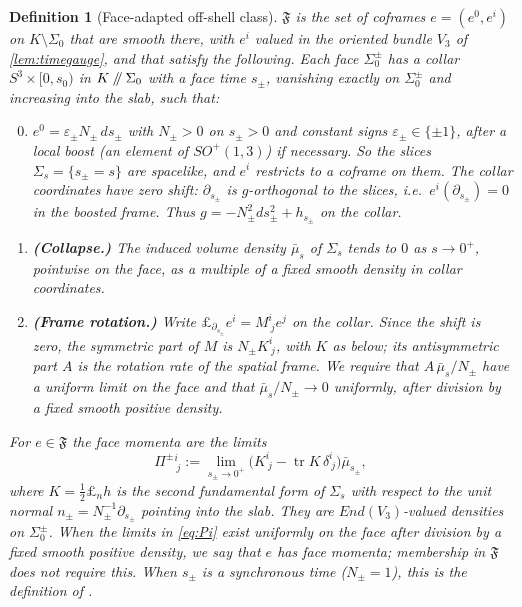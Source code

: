 \documentclass[11pt]{article}
\theoremstyle{canonmath}
\newtheorem{definition}[theorem]{Definition}
\theoremstyle{canonpostulate}
\theoremstyle{canonproposition}
\theoremstyle{canonmath}
\theoremstyle{canonproposition}
\providecommand{\cutK}{\Klein\mathbin{/\mkern-5mu/}\Sigma_0}
\providecommand{\Vb}{\mathcal{V}}
\providecommand{\Fcl}{\mathfrak{F}}
\providecommand{\Klein}{\mathcal{K}}
\def\mathrm#1{#1}%
\def\mathcal#1{#1}%
\begin{document}
\begin{definition}[Face-adapted off-shell class]\label{def:Fclass}
$\Fcl$ is the set of coframes $e = (e^0,e^i)$ on $\Klein\setminus\Sigma_0$ that are smooth there, with $e^i$ valued in the oriented bundle $\Vb_3$ of \cref{lem:timegauge}, and that satisfy the following. Each face $\Sigma_0^\pm$ has a collar $S^3\times[0,s_0)$ in $\cutK$ with a \emph{face time} $s_\pm$, vanishing exactly on $\Sigma_0^\pm$ and increasing into the slab, such that:
\begin{enumerate}[label=(F\arabic*)]
\setcounter{enumi}{-1}
\item $e^0 = \varepsilon_\pm N_\pm\,ds_\pm$ with $N_\pm>0$ on $s_\pm>0$ and constant signs $\varepsilon_\pm\in\{\pm1\}$, after a local boost (an element of $SO^+(1,3)$) if necessary. So the slices $\Sigma_s = \{s_\pm = s\}$ are spacelike, and $e^i$ restricts to a coframe on them. The collar coordinates have zero shift: $\partial_{s_\pm}$ is $g$-orthogonal to the slices, i.e.\ $e^i(\partial_{s_\pm}) = 0$ in the boosted frame. Thus $g = -N_\pm^2ds_\pm^2 + h_{s_\pm}$ on the collar.
\item \textbf{(Collapse.)} The induced volume density $\bar\mu_s$ of $\Sigma_s$ tends to $0$ as $s\to0^+$, pointwise on the face, as a multiple of a fixed smooth density in collar coordinates.
\item \textbf{(Frame rotation.)} Write $\pounds_{\partial_{s_\pm}}e^i = M^i_{\ j}e^j$ on the collar. Since the shift is zero, the symmetric part of $M$ is $N_\pm K^i_{\ j}$, with $K$ as below; its antisymmetric part $A$ is the rotation rate of the spatial frame. We require that $A\,\bar\mu_s/N_\pm$ have a uniform limit on the face and that $\bar\mu_s/N_\pm\to0$ uniformly, after division by a fixed smooth positive density.
\end{enumerate}
For $e\in\Fcl$ the \emph{face momenta} are the limits
\begin{equation}
\Pi^\pm{}^i_{\ j} := \lim_{s_\pm\to0^+}\bigl(K^i_{\ j}-\operatorname{tr}K\,\delta^i_{\ j}\bigr)\bar\mu_{s_\pm},
\label{eq:Pi}
\end{equation}
where $K = \tfrac12\pounds_n h$ is the second fundamental form of $\Sigma_s$ with respect to the unit normal $n_\pm = N_\pm^{-1}\partial_{s_\pm}$ pointing into the slab. They are $\mathrm{End}(\Vb_3)$-valued densities on $\Sigma_0^\pm$. When the limits in \eqref{eq:Pi} exist uniformly on the face after division by a fixed smooth positive density, we say that $e$ \emph{has face momenta}; membership in $\Fcl$ does not require this. When $s_\pm$ is a synchronous time ($N_\pm=1$), this is the definition of \cite{TBT2026}.
\end{definition}
\end{document}
